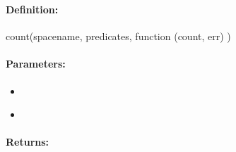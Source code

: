 \subsubsection{}
\label{api:nodejs:count}


\paragraph{Definition:}
\begin{javascriptcode}
count(spacename, predicates, function (count, err) {})
\end{javascriptcode}
\paragraph{Parameters:}
\begin{itemize}[noitemsep]
\item {}\\

\item {}\\

\end{itemize}

\paragraph{Returns:}

